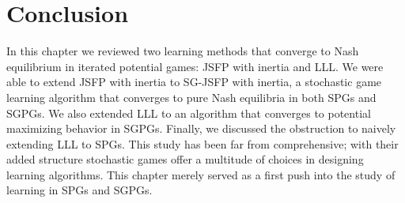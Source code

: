 \section{Conclusion}

In this chapter we reviewed two learning methods that converge to Nash equilibrium in iterated potential games: JSFP with inertia and LLL. We were able to extend JSFP with inertia to SG-JSFP with inertia, a stochastic game learning algorithm that converges to pure Nash equilibria in both SPGs and SGPGs. We also extended LLL to an algorithm that converges to potential maximizing behavior in SGPGs. Finally, we discussed the obstruction to naively extending LLL to SPGs. This study has been far from comprehensive; with their added structure stochastic games offer a multitude of choices in designing learning algorithms. This chapter merely served as a first push into the study of learning in SPGs and SGPGs.